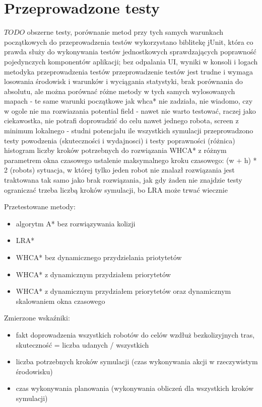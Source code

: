 \chapter{Przeprowadzone testy}
\label{ch:tests}

$TODO$
obszerne testy, porównanie metod przy tych samych warunkach początkowych
do przeprowadzenia testów wykorzystano biblitekę jUnit, która co prawda służy do wykonywania testów jednostkowych sprawdzających poprawność pojedynczych komponentów aplikacji; bez odpalania UI, wyniki w konsoli i logach
metodyka przeprowadzenia testów
przeprowadzenie testów jest trudne i wymaga losowania środowisk i warunków i wyciągania statystyki, brak porównania do absolutu, ale można porównać różne metody w tych samych wylosowanych mapach - te same warunki początkowe
jak whca* nie zadziała, nie wiadomo, czy w ogole nie ma rozwiazania
potential field - nawet nie warto testować, raczej jako ciekawostka, nie potrafi doprowadzić do celu nawet jednego robota, screen z minimum lokalnego - studni potencjału
ile wszystkich symulacji przeprowadzono
testy powodzenia (skuteczności i wydajnosci) i testy poprawności (różnica)
histogram liczby kroków potrzebnych do rozwiązania
WHCA* z różnym parametrem okna czasowego
ustalenie maksymalnego kroku czasowego: (w + h) * 2 (robots)
sytuacja, w której tylko jeden robot nie znalazł rozwiązania jest traktowana tak samo jako brak rozwiązania, jak gdy żaden nie znajdzie
testy ograniczać trzeba liczbą kroków symulacji, bo LRA może trwać wiecznie

Przetestowane metody:
\begin{itemize}
	\item algorytm A* bez rozwiązywania kolizji
	\item LRA*
	\item WHCA* bez dynamicznego przydzielania priotytetów
	\item WHCA* z dynamicznym przydziałem priorytetów
	\item WHCA* z dynamicznym przydziałem priorytetów oraz dynamicznym skalowaniem okna czasowego
\end{itemize}

Zmierzone wskaźniki:
\begin{itemize}
	\item fakt doprowadzenia wszystkich robotów do celów wzdłuż bezkolizyjnych tras, skuteczność = liczba udanych / wszystkich
	\item liczba potrzebnych kroków symulacji (czas wykonywania akcji w rzeczywistym środowisku)
	\item czas wykonywania planowania (wykonywania obliczeń dla wszystkich kroków symulacji)
\end{itemize}

